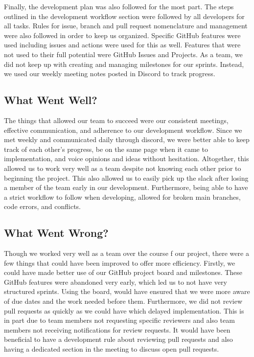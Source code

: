 \documentclass{article}
\begin{document}
Finally, the development plan was also followed for the most part. The steps outlined in the development workflow section were followed by all developers for all tasks. Rules for issue, branch and pull request nomenclature and management were also followed in order to keep us organized. Specific GitHub features were used including issues and actions were used for this as well. Features that were not used to their full potential were GitHub Issues and Projects. As a team, we did not keep up with creating and managing milestones for our sprints. Instead, we used our weekly meeting notes posted in Discord to track progress. 

\subsection{What Went Well?}


The things that allowed our team to succeed were our consistent meetings, effective communication, and adherence to our development workflow. Since we met weekly and communicated daily through discord, we were better able to keep track of each other's progress, be on the same page when it came to implementation, and voice opinions and ideas without hesitation. Altogether, this allowed us to work very well as a team despite not knowing each other prior to beginning the project. This also allowed us to easily pick up the slack after losing a member of the team early in our development. Furthermore, being able to have a strict workflow to follow when developing, allowed for broken main branches, code errors, and conflicts.

\subsection{What Went Wrong?}


Though we worked very well as a team over the course f our project, there were a few things that could have been improved to offer more efficiency. Firstly, we could have made better use of our GitHub project board and milestones. These GitHub features were abandoned very early, which led us to not have very structured sprints. Using the board, would have ensured that we were more aware of due dates and the work needed before them. Furthermore, we did not review pull requests as quickly as we could have which delayed implementation. This is in part due to team members not requesting specific reviewers and also team members not receiving notifications for review requests. It would have been beneficial to have a development rule about reviewing pull requests and also having a dedicated section in the meeting to discuss open pull requests.
\end{document}
